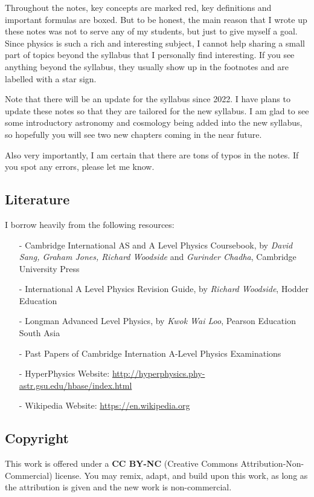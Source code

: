 Throughout the notes, key concepts are marked red, key definitions and important formulas are boxed. But to be honest, the main reason that I wrote up these notes was not to serve any of my students, but just to give myself a goal. Since physics is such a rich and interesting subject, I cannot help sharing a small part of topics beyond the syllabus that I personally find interesting. If you see anything beyond the syllabus, they usually show up in the footnotes and are labelled with a star sign.

Note that there will be an update for the syllabus since 2022. I have plans to update these notes so that they are tailored for the new syllabus. I am glad to see some introductory astronomy and cosmology being added into the new syllabus, so hopefully you will see two new chapters coming in the near future.

Also very importantly, I am certain that there are tons of typos in the notes. If you spot any errors, please let me know.


\subsection*{Literature}

I borrow heavily from the following resources:

\begin{itemize}
\item[-] Cambridge International AS and A Level Physics Coursebook, by \textit{David Sang, Graham Jones, Richard Woodside} and \textit{Gurinder Chadha}, Cambridge University Press

\item[-] International A Level Physics Revision Guide, by \textit{Richard Woodside}, Hodder Education

\item[-] Longman Advanced Level Physics, by \textit{Kwok Wai Loo},	Pearson Education South Asia

\item[-] Past Papers of Cambridge Internation A-Level Physics Examinations

\item[-] HyperPhysics Website: \url{http://hyperphysics.phy-astr.gsu.edu/hbase/index.html}

\item[-] Wikipedia Website: \url{https://en.wikipedia.org}
\end{itemize}

\subsection*{Copyright}

This work is offered under a \textbf{CC BY-NC} (Creative Commons Attribution-Non-Commercial) license. You may remix, adapt, and build upon this work, as long as the attribution is given and the new work is non-commercial.